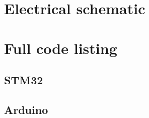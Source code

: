 \documentclass[12pt]{article}
\begin{document}
	\section{Electrical schematic}
	\section{Full code listing}
  \subsection{STM32}
  \label{appendix:code}
  
  \newpage
  \subsection{Arduino}
  
	
\end{document}
